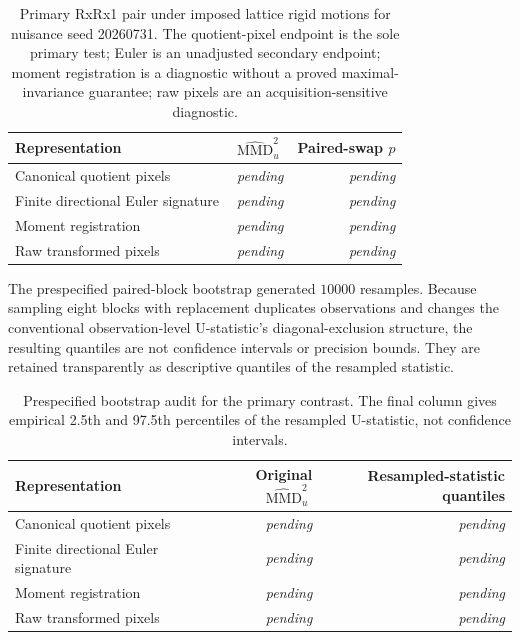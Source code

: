\documentclass[11pt]{article}
\theoremstyle{plain}
\theoremstyle{definition}
\numberwithin{equation}{section}
\DeclareMathOperator{\MMD}{MMD}
\newcommand{\1}{\mathbf 1}
\newcommand{\pending}{\textnormal{\textit{pending}}}
\providecommand{\RxCanonicalMMD}{\pending}
\providecommand{\RxCanonicalMMDCI}{\pending}
\providecommand{\RxCanonicalP}{\pending}
\providecommand{\RxEulerMMD}{\pending}
\providecommand{\RxEulerMMDCI}{\pending}
\providecommand{\RxEulerP}{\pending}
\providecommand{\RxRawMMD}{\pending}
\providecommand{\RxRawMMDCI}{\pending}
\providecommand{\RxRawP}{\pending}
\providecommand{\RxMomentMMD}{\pending}
\providecommand{\RxMomentMMDCI}{\pending}
\providecommand{\RxMomentP}{\pending}
\providecommand{\RxBootstrapReplicates}{10000}
\begin{document}
\begin{table}[!htbp]
\caption{Primary RxRx1 pair under imposed lattice rigid motions for nuisance
seed 20260731. The quotient-pixel endpoint is the sole primary test; Euler is
an unadjusted secondary endpoint; moment registration is a diagnostic without
a proved maximal-invariance guarantee; raw pixels are an acquisition-sensitive
diagnostic.\label{tab:primary}}
\centering
\begin{tabular}{@{}lrr@{}}
\toprule
Representation & $\widehat{\MMD}_u^2$ & Paired-swap $p$\\
\midrule
Canonical quotient pixels & \RxCanonicalMMD & \RxCanonicalP\\
Finite directional Euler signature & \RxEulerMMD & \RxEulerP\\
Moment registration & \RxMomentMMD & \RxMomentP\\
Raw transformed pixels & \RxRawMMD & \RxRawP\\
\bottomrule
\end{tabular}
\end{table}

The prespecified paired-block bootstrap generated $\RxBootstrapReplicates$
resamples. Because sampling eight blocks with replacement duplicates
observations and changes the conventional observation-level U-statistic's
diagonal-exclusion structure, the resulting quantiles are not confidence
intervals or precision bounds. They are retained transparently as descriptive
quantiles of the resampled statistic.

\begin{table}[!htbp]
\caption{Prespecified bootstrap audit for the primary contrast. The final
column gives empirical 2.5th and 97.5th percentiles of the resampled
U-statistic, not confidence intervals.\label{tab:bootstrap-audit}}
\centering
\begin{tabular}{@{}lrr@{}}
\toprule
Representation & Original $\widehat{\MMD}_u^2$ & Resampled-statistic quantiles\\
\midrule
Canonical quotient pixels & \RxCanonicalMMD & \RxCanonicalMMDCI\\
Finite directional Euler signature & \RxEulerMMD & \RxEulerMMDCI\\
Moment registration & \RxMomentMMD & \RxMomentMMDCI\\
Raw transformed pixels & \RxRawMMD & \RxRawMMDCI\\
\bottomrule
\end{tabular}
\end{table}
\end{document}
